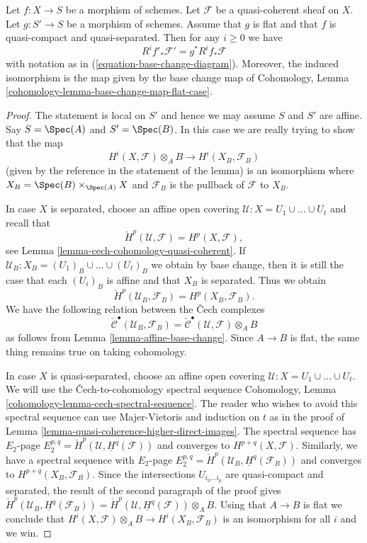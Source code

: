 \begin{lemma}
\label{lemma-flat-base-change-cohomology}
Let $f : X \to S$ be a morphism of schemes.
Let $\mathcal{F}$ be a quasi-coherent sheaf on $X$.
Let $g : S' \to S$ be a morphism of schemes.
Assume that $g$ is flat and that $f$ is quasi-compact and
quasi-separated.
Then for any $i \geq 0$ we have
$$
R^if'_*\mathcal{F}' = g^*R^if_*\mathcal{F}
$$
with notation as in (\ref{equation-base-change-diagram}).
Moreover, the induced isomorphism is the map given by the
base change map of
Cohomology, Lemma \ref{cohomology-lemma-base-change-map-flat-case}.
\end{lemma}

\begin{proof}
The statement is local on $S'$ and hence we may assume $S$ and
$S'$ are affine. Say $S = \Spec(A)$ and $S' = \Spec(B)$.
In this case we are really trying to show that the map
$$
H^i(X, \mathcal{F}) \otimes_A B \longrightarrow H^i(X_B, \mathcal{F}_B)
$$
(given by the reference in the statement of the lemma)
is an isomorphism where $X_B = \Spec(B) \times_{\Spec(A)} X$ and
$\mathcal{F}_B$ is the pullback of $\mathcal{F}$ to $X_B$.

\medskip\noindent
In case $X$ is separated, choose an affine open covering
$\mathcal{U} : X = U_1 \cup \ldots \cup U_t$ and recall that
$$
\check{H}^p(\mathcal{U}, \mathcal{F}) = H^p(X, \mathcal{F}),
$$
see
Lemma \ref{lemma-cech-cohomology-quasi-coherent}.
If $\mathcal{U}_B : X_B = (U_1)_B \cup \ldots \cup (U_t)_B$ we obtain
by base change, then it is still the case that each $(U_i)_B$ is affine
and that $X_B$ is separated. Thus we obtain
$$
\check{H}^p(\mathcal{U}_B, \mathcal{F}_B) = H^p(X_B, \mathcal{F}_B).
$$
We have the following relation between the {\v C}ech complexes
$$
\check{\mathcal{C}}^\bullet(\mathcal{U}_B, \mathcal{F}_B) =
\check{\mathcal{C}}^\bullet(\mathcal{U}, \mathcal{F}) \otimes_A B
$$
as follows from
Lemma \ref{lemma-affine-base-change}.
Since $A \to B$ is flat, the same thing remains true on taking cohomology.

\medskip\noindent
In case $X$ is quasi-separated, choose an affine open covering
$\mathcal{U} : X = U_1 \cup \ldots \cup U_t$. We will use the
{\v C}ech-to-cohomology spectral sequence
Cohomology, Lemma \ref{cohomology-lemma-cech-spectral-sequence}.
The reader who wishes to avoid this spectral sequence
can use Majer-Vietoris and induction on $t$ as in the proof of
Lemma \ref{lemma-quasi-coherence-higher-direct-images}.
The spectral sequence has $E_2$-page
$E_2^{p, q} = \check{H}^p(\mathcal{U}, \underline{H}^q(\mathcal{F}))$
and converges to $H^{p + q}(X, \mathcal{F})$.
Similarly, we have a spectral sequence with $E_2$-page
$E_2^{p, q} = \check{H}^p(\mathcal{U}_B, \underline{H}^q(\mathcal{F}_B))$
and converges to $H^{p + q}(X_B, \mathcal{F}_B)$.
Since the intersections $U_{i_0 \ldots i_p}$ are quasi-compact
and separated, the result of the second paragraph of the proof gives
$\check{H}^p(\mathcal{U}_B, \underline{H}^q(\mathcal{F}_B)) =
\check{H}^p(\mathcal{U}, \underline{H}^q(\mathcal{F})) \otimes_A B$.
Using that $A \to B$ is flat we conclude that
$H^i(X, \mathcal{F}) \otimes_A B \to H^i(X_B, \mathcal{F}_B)$
is an isomorphism for all $i$ and we win.
\end{proof}
